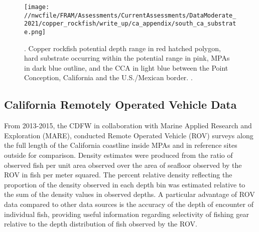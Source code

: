 \documentclass[11pt,
  english,
  a4paper,
]{article}
\begin{document}
\tagmcend\tagstructend


\begin{figure}
\centering
\texttt{[image: //nwcfile/FRAM/Assessments/CurrentAssessments/DataModerate\_2021/copper\_rockfish/write\_up/ca\_appendix/south\_ca\_substrate.png]}
\caption{. Copper rockfish potential depth range in red hatched polygon, hard substrate occurring within the potential range in pink, MPAs in dark blue outline, and the CCA in light blue between the Point Conception, California and the U.S./Mexican border. .\label{fig:south-ca-app}}
\end{figure}

\tagmcend\tagstructend

\newpage


\hypertarget{california-remotely-operated-vehicle-data}{%
\subsection{California Remotely Operated Vehicle Data}\label{california-remotely-operated-vehicle-data}}

\leavevmode\tagmcend\tagstructend


From 2013-2015, the CDFW in collaboration with Marine Applied Research and Exploration (MARE), conducted Remote Operated Vehicle (ROV) surveys along the full length of the California coastline inside MPAs and in reference sites outside for comparison. Density estimates were produced from the ratio of observed fish per unit area observed over the area of seafloor observed by the ROV in fish per meter squared. The percent relative density reflecting the proportion of the density observed in each depth bin was estimated relative to the sum of the density values in observed depths. A particular advantage of ROV data compared to other data sources is the accuracy of the depth of encounter of individual fish, providing useful information regarding selectivity of fishing gear relative to the depth distribution of fish observed by the ROV.

\leavevmode\tagmcend\tagstructend\par

\end{document}
